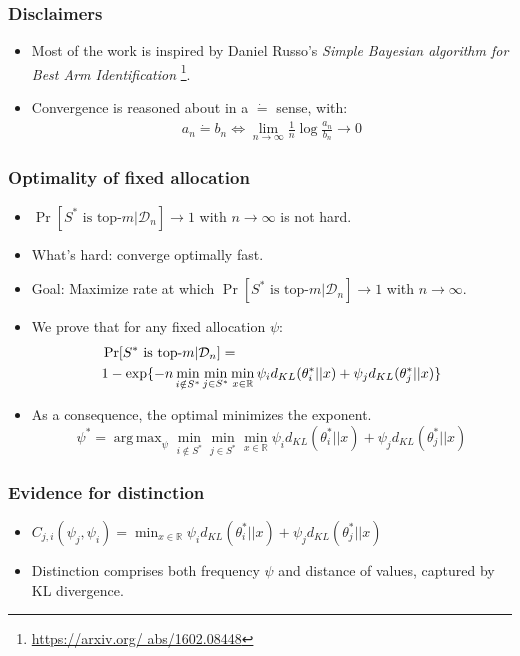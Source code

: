 \documentclass[aspectratio=43]{beamer}
\DeclareMathOperator*{\argmax}{arg\,max}
\newcommand{\deq}{\dot{=}}
\newcommand{\tikzmark}[1]{\tikz[overlay,remember picture] \node (#1) {};}
\begin{document}
\begin{frame}
\frametitle{Disclaimers}
\begin{itemize}[<+->]
  \item Most of the work is inspired by Daniel Russo's \emph{Simple Bayesian
      algorithm for Best Arm Identification} \footnote{\url{https://arxiv.org/
      abs/1602.08448}}.
  \item Convergence is reasoned about in a $\deq$ sense, with:
\begin{align}
  a_n \deq b_n \Leftrightarrow \lim_{n \rightarrow
  \infty}\frac{1}{n}\log{\frac{a_n}{b_n}} \rightarrow 0
\end{align}
\end{itemize}
\end{frame}

\begin{frame}
\frametitle{Optimality of fixed allocation}
\begin{itemize}[<+->]
  \item $\Pr[S^* \text{ is top-}m | \mathcal{D}_n] \rightarrow 1$ with $n
      \rightarrow \infty$ is not hard.
  \item What's hard: converge optimally fast.
  \item Goal: Maximize rate at which $\Pr[S^* \text{ is top-}m |
      \mathcal{D}_n] \rightarrow 1$ with $n \rightarrow \infty$.
  \item We prove that for any fixed allocation $\psi$:
    \begin{align}
      &\Pr[S^* \text{ is top-}m | \mathcal{D}_n] = \\
      &1 - \exp\{-n \min_{i \notin S^*} \min_{j \in S^*}
          \tikzmark{infrastructure}{\min_{x \in \mathbb{R}} \psi_i
          d_{KL}(\theta^*_i || x) + \psi_j d_{KL}(\theta^*_j || x)} \}
    \end{align}
  \item As a consequence, the optimal minimizes the exponent.
  \[\psi^* = \argmax_{\psi} \min_{i \notin S^*}\min_{j \in S^*} \min_{x \in
      \mathbb{R}} \psi_i d_{KL}(\theta^*_i || x) + \psi_j d_{KL}(\theta^*_j || x)\]
\end{itemize}
\pause{}
\end{frame}

\begin{frame}
\frametitle{Evidence for distinction}
\begin{itemize}[<+->]
  \item $C_{j, i}(\psi_j, \psi_i) = \min_{x \in \mathbb{R}} \psi_i d_{KL}
      (\theta^*_i || x) + \psi_j d_{KL}(\theta^*_j || x)$
  \item Distinction comprises both frequency $\psi$ and distance of values,
      captured by KL divergence.
\end{itemize}
\end{frame}
\end{document}
